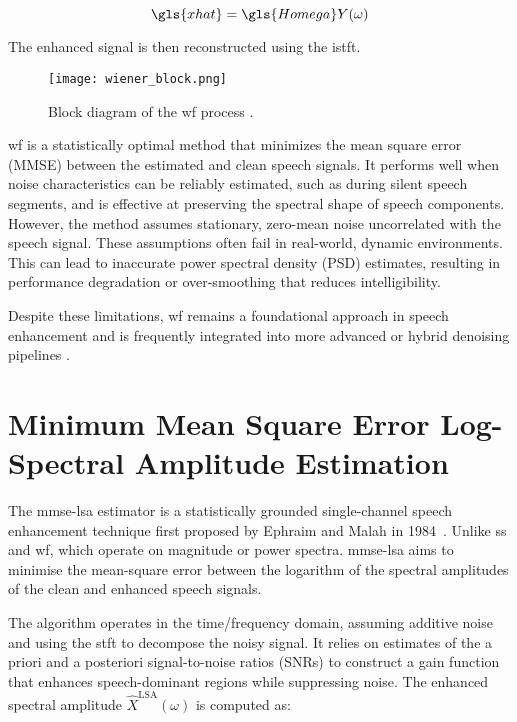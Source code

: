 \begin{equation}
    \gls{xhat} = \gls{Homega}Y(\omega)
\end{equation}

The enhanced signal is then reconstructed using the \gls{istft}.

\begin{figure}[h]
    \centering
    \texttt{[image: wiener\_block.png]}
    \caption{\label{fig:WienerBlock} Block diagram of the \gls{wf} process \cite{dubey2016evaluation}.}
\end{figure}

\gls{wf} is a statistically optimal method that minimizes the mean square error (MMSE) between the estimated and clean speech signals. It performs well when noise characteristics can be reliably estimated, such as during silent speech segments, and is effective at preserving the spectral shape of speech components. However, the method assumes stationary, zero-mean noise uncorrelated with the speech signal. These assumptions often fail in real-world, dynamic environments. This can lead to inaccurate power spectral density (PSD) estimates, resulting in performance degradation or over-smoothing that reduces intelligibility.

Despite these limitations, \gls{wf} remains a foundational approach in speech enhancement and is frequently integrated into more advanced or hybrid denoising pipelines \cite{dubey2016evaluation, loizou2013speech}.


\section{Minimum Mean Square Error Log-Spectral Amplitude Estimation}
\label{sec:mmse_lsa}

The \gls{mmse-lsa} estimator is a statistically grounded single-channel speech enhancement technique first proposed by Ephraim and Malah in 1984~\cite{ephraim1984speech}. Unlike \gls{ss} and \gls{wf}, which operate on magnitude or power spectra. \gls{mmse-lsa} aims to minimise the mean-square error between the logarithm of the spectral amplitudes of the clean and enhanced speech signals.

The algorithm operates in the time/frequency domain, assuming additive noise and using the \gls{stft} to decompose the noisy signal. It relies on estimates of the a priori and a posteriori signal-to-noise ratios (SNRs) to construct a gain function that enhances speech-dominant regions while suppressing noise. The enhanced spectral amplitude \( \hat{X}^{\text{LSA}}(\omega) \) is computed as:

